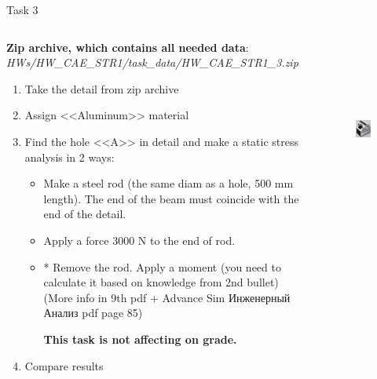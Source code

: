 \documentclass[aspectratio=169]{beamer}
\begin{document}
\begin{frame}[t]{Task 3}
    \vspace{-0.4cm}
    \begin{columns}[T,onlytextwidth]
        \begin{column}{0.59\textwidth}
            \scriptsize
            \textbf{Zip archive, which contains all needed data}: \textit{HWs/HW\_CAE\_STR1/task\_data/HW\_CAE\_STR1\_3.zip}
            \begin{enumerate}
                \item Take the detail from zip archive
                \item Assign <<Aluminum>> material
                \item Find the hole <<A>> in detail and make a static stress analysis in 2 ways:
                      \begin{itemize}
                        \scriptsize
                          \item Make a steel rod (the same diam as a hole, 500 mm length). The end of the beam must coincide with the end of the detail.
                          \item Apply a force 3000 N to the end of rod.
                          \item * Remove the rod. Apply a moment (you need to calculate it based on knowledge from 2nd bullet) (More info in 9th pdf + Advance Sim Инженерный Анализ pdf page 85)
                          
                            \textbf{This task is not affecting on grade.}
                      \end{itemize}
                \item Compare results
            \end{enumerate}
        \end{column}
        \begin{column}{0.39\textwidth}
            \begin{figure}[H]
                \centering\includegraphics[height=6cm,width=1\textwidth,keepaspectratio]{HW_CAE_STR1_3.png}
                \label{fig:HW_CAE_STR1_3.png}
            \end{figure}
        \end{column}
    \end{columns}
\end{frame}
\end{document}
